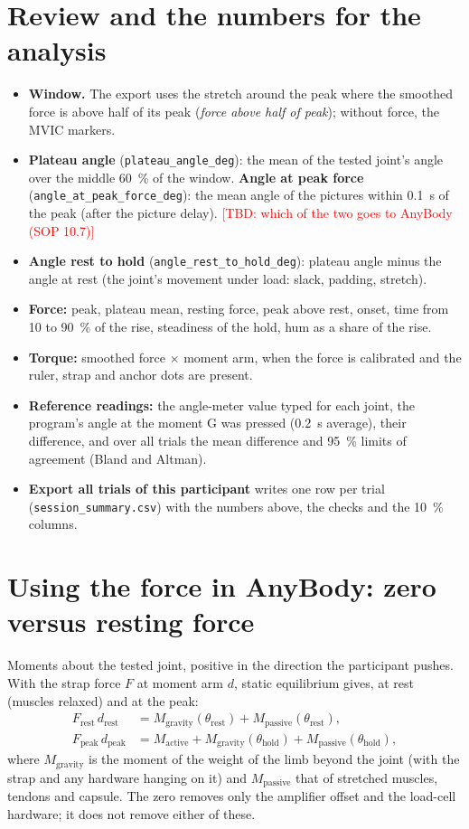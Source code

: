 \documentclass[a4paper,10pt]{article}
\newcommand{\code}[1]{\texttt{#1}}
\newcommand{\tbd}[1]{\textcolor{red}{[TBD: #1]}}
\begin{document}
\section{Review and the numbers for the analysis}
\begin{itemize}
\item \textbf{Window.} The export uses the stretch around the peak where the smoothed force is above half of its peak (\emph{force above
  half of peak}); without force, the MVIC markers.
\item \textbf{Plateau angle} (\code{plateau\_angle\_deg}): the mean of the tested joint's angle over the middle 60~\% of the window.
  \textbf{Angle at peak force} (\code{angle\_at\_peak\_force\_deg}): the mean angle of the pictures within 0.1~s of the peak (after the
  picture delay). \tbd{which of the two goes to AnyBody (SOP 10.7)}
\item \textbf{Angle rest to hold} (\code{angle\_rest\_to\_hold\_deg}): plateau angle minus the angle at rest (the joint's movement under
  load: slack, padding, stretch).
\item \textbf{Force:} peak, plateau mean, resting force, peak above rest, onset, time from 10 to 90~\% of the rise, steadiness of the
  hold, hum as a share of the rise.
\item \textbf{Torque:} smoothed force $\times$ moment arm, when the force is calibrated and the ruler, strap and anchor dots are present.
\item \textbf{Reference readings:} the angle-meter value typed for each joint, the program's angle at the moment G was pressed (0.2~s
  average), their difference, and over all trials the mean difference and 95~\% limits of agreement (Bland and Altman).
\item \textbf{Export all trials of this participant} writes one row per trial (\code{session\_summary.csv}) with the numbers above, the
  checks and the 10~\% columns.
\end{itemize}

\section{Using the force in AnyBody: zero versus resting force}\label{sec:anybody}
Moments about the tested joint, positive in the direction the participant pushes. With the strap force $F$ at moment arm $d$, static
equilibrium gives, at rest (muscles relaxed) and at the peak:
\begin{align*}
F_\text{rest}\,d_\text{rest} &= M_\text{gravity}(\theta_\text{rest}) + M_\text{passive}(\theta_\text{rest}),\\
F_\text{peak}\,d_\text{peak} &= M_\text{active} + M_\text{gravity}(\theta_\text{hold}) + M_\text{passive}(\theta_\text{hold}),
\end{align*}
where $M_\text{gravity}$ is the moment of the weight of the limb beyond the joint (with the strap and any hardware hanging on it) and
$M_\text{passive}$ that of stretched muscles, tendons and capsule. The zero removes only the amplifier offset and the load-cell hardware;
it does not remove either of these.
\end{document}
